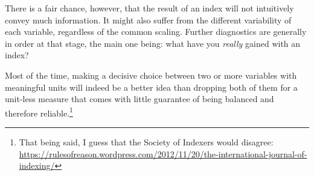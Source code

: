 There is a fair chance, however, that the result of an index will not intuitively convey much information. It might also suffer from the different variability of each variable, regardless of the common scaling. Further diagnostics are generally in order at that stage, the main one being: what have you \emph{really} gained with an index?

Most of the time, making a decisive choice between two or more variables with meaningful units will indeed be a better idea than dropping both of them for a unit-less measure that comes with little guarantee of being balanced and therefore reliable.\footnote{That being said, I guess that the Society of Indexers would disagree: \url{https://rulesofreason.wordpress.com/2012/11/20/the-international-journal-of-indexing/}}